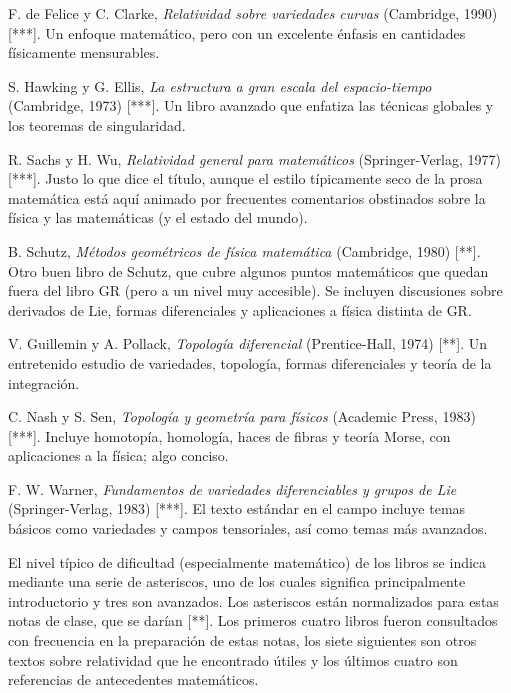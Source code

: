 \documentclass[11pt,b5paper,openany,twoside]{book}
\begin{document}
\begin{thebibliography}{99}
 F. de Felice y C. Clarke, \textit{Relatividad sobre variedades curvas} (Cambridge, 1990) [***]. Un enfoque matemático, pero con un excelente énfasis en cantidades físicamente mensurables.

 S. Hawking y G. Ellis, \textit{La estructura a gran escala del espacio-tiempo} (Cambridge, 1973) [***]. Un libro avanzado que enfatiza las técnicas globales y los teoremas de singularidad.

 R. Sachs y H. Wu, \textit{Relatividad general para matemáticos} (Springer-Verlag, 1977) [***]. Justo lo que dice el título, aunque el estilo típicamente seco de la prosa matemática está aquí animado por frecuentes comentarios obstinados sobre la física y las matemáticas (y el estado del mundo).

 B. Schutz,\textit{ Métodos geométricos de física matemática} (Cambridge, 1980) [**]. Otro buen libro de Schutz, que cubre algunos puntos matemáticos que quedan fuera del libro GR (pero a un nivel muy accesible). Se incluyen discusiones sobre derivados de Lie, formas diferenciales y aplicaciones a física distinta de GR.

 V. Guillemin y A. Pollack,\textit{ Topología diferencial} (Prentice-Hall, 1974) [**]. Un entretenido estudio de variedades, topología, formas diferenciales y teoría de la integración.

 C. Nash y S. Sen, \textit{Topología y geometría para físicos} (Academic Press, 1983) [***]. Incluye homotopía, homología, haces de fibras y teoría Morse, con aplicaciones a la física; algo conciso.

 F. W. Warner, \textit{Fundamentos de variedades diferenciables y grupos de Lie} (Springer-Verlag, 1983) [***]. El texto estándar en el campo incluye temas básicos como variedades y campos tensoriales, así como temas más avanzados.

\vspace{1cm}
El nivel típico de dificultad (especialmente matemático) de los libros se indica mediante una serie de asteriscos, uno de los cuales significa principalmente introductorio y tres son avanzados. Los asteriscos están normalizados para estas notas de clase, que se darían [**]. Los primeros cuatro libros fueron consultados con frecuencia en la preparación de estas notas, los siete siguientes son otros textos sobre relatividad que he encontrado útiles y los últimos cuatro son referencias de antecedentes matemáticos.

\end{thebibliography}
\end{document}
